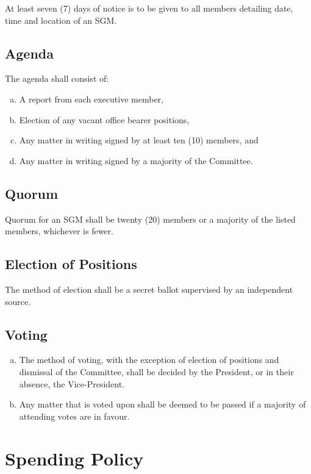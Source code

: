\documentclass[a4paper,12pt]{article}
\begin{document}
At least seven (7) days of notice is to be given to all members detailing date, time and location of an SGM.

\subsection{Agenda}

The agenda shall consist of:

\begin{enumerate}[a)]
	\item A report from each executive member,
	\item Election of any vacant office bearer positions,
	\item Any matter in writing signed by at least ten (10) members, and
	\item Any matter in writing signed by a majority of the Committee.
\end{enumerate}

\subsection{Quorum}

Quorum for an SGM shall be twenty (20) members or a majority of the listed members, whichever is fewer.

\subsection{Election of Positions}

The method of election shall be a secret ballot supervised by an independent source.

\subsection{Voting}

\begin{enumerate}[a)]
	\item The method of voting, with the exception of election of positions and dismissal of the Committee, shall be decided by the President, or in their absence, the Vice-President.
	\item Any matter that is voted upon shall be deemed to be passed if a majority of attending votes are in favour.
\end{enumerate}

\section{Spending Policy}
\end{document}
